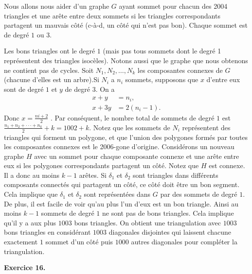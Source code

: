 \begin{sol}

Nous allons nous aider d’un graphe $G$ ayant sommet pour chacun des 2004 triangles et une arête entre deux sommets si les triangles correspondants partagent un mauvais côté (c-à-d, un côté qui n’est pas bon).
Chaque sommet est de degré $1$ ou $3$.

Les bons triangles ont le degré $1$ (mais pas tous sommets dont le degré 1 représentent des triangles isocèles). Notons aussi que le graphe que nous obtenons ne contient pas de cycles.
Soit $N_1,N_2,\ldots, N_k$ les composantes connexes de $G$ (chacune d'elles est un arbre).Si $N_i $ a $n_i$ sommets, supposons que $x$ d’entre eux sont de degré $1$ et $y$ de degré $3$.
On a
\begin{align*}
x +y &= n_i ,\\
x +3y &= 2(n_i - 1).
\end{align*}
Donc $x = \frac{ni+2 }{2}$ . Par conséquent, le nombre total de sommets de degré $1$ est $\frac{n_1+n_2+···+n_k}{2}+ k = 1002 + k$. Notez que les sommets de $N_i$ représentent des triangles qui forment un polygone,
et que l'union des polygones formés par toutes les composantes connexes est le 2006-gone d’origine. Considérons un nouveau graphe $H $ avec un sommet pour chaque composante connexe et une arête entre eux si les polygones correspondants partagent un côté. Notez que $H $ est connexe. Il a donc au moins $k - 1$ arêtes. Si $\delta_1$ et $\delta_2$ sont triangles dans différents composants connectés qui partagent un côté, ce côté doit être un bon segment. Cela implique que $\delta_1$ et $\delta_2$ sont représentées dans $G$ par des sommets de degré $1$. De plus, il est facile de voir qu'au plus l'un d'eux est un bon triangle. Ainsi au moins $k - 1$ sommets de degré $1$ ne sont pas de bons triangles. Cela implique qu'il y a aux plus $1003$ bons triangles. On obtient une triangulation avec $1003$ bons triangles en considérant $1003$ diagonales disjointes qui laissent chacune exactement $1$ sommet d'un côté puis $1000$ autres diagonales pour compléter la triangulation.\\

\end{sol}

{\bf Exercice 16.}

